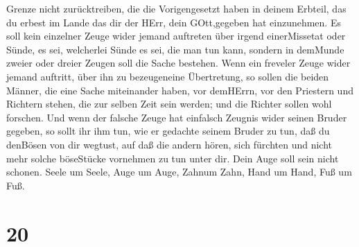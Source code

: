 Grenze nicht zurücktreiben, die die Vorigengesetzt haben in deinem
Erbteil, das du erbest im Lande das dir der HErr, dein GOtt,gegeben hat
einzunehmen.  Es soll kein einzelner Zeuge wider jemand
auftreten über irgend einerMissetat oder Sünde, es sei, welcherlei Sünde
es sei, die man tun kann, sondern in demMunde zweier oder dreier Zeugen
soll die Sache bestehen.  Wenn ein freveler Zeuge wider
jemand auftritt, über ihn zu bezeugeneine Übertretung,  so
sollen die beiden Männer, die eine Sache miteinander haben, vor
demHErrn, vor den Priestern und Richtern stehen, die zur selben Zeit
sein werden;  und die Richter sollen wohl forschen. Und
wenn der falsche Zeuge hat einfalsch Zeugnis wider seinen Bruder
gegeben,  so sollt ihr ihm tun, wie er gedachte seinem
Bruder zu tun, daß du denBösen von dir wegtust,  auf daß
die andern hören, sich fürchten und nicht mehr solche böseStücke
vornehmen zu tun unter dir.  Dein Auge soll sein nicht
schonen. Seele um Seele, Auge um Auge, Zahnum Zahn, Hand um Hand, Fuß um
Fuß.

\hypertarget{section-19}{%
\section{20}\label{section-19}}

